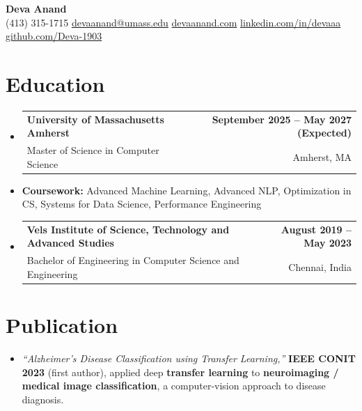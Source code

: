 \documentclass[letterpaper,10pt]{article}
\makeatletter
\newcommand{\resumeSubheading}[4]{
  \vspace{1pt}\item
    \begin{tabular*}{0.985\textwidth}[t]{l@{\extracolsep{\fill}}r}
      \textbf{#1} & \textbf{\small #2} \\
      {\small\color{ResumeSlate} #3} & {\small\color{ResumeSlate} #4} \\
    \end{tabular*}\vspace{-6pt}
}
\newcommand{\resumeSubItem}[1]{\item[]\small{#1\vspace{-1pt}}}
\newcommand{\resumeSubHeadingListStart}{\begin{itemize}[leftmargin=0.0in, label={}, itemsep=2pt, topsep=2pt]}
\newcommand{\resumeSubHeadingListEnd}{\end{itemize}}
\makeatother
\begin{document}
\begin{center}
    {\LARGE \bfseries \textcolor{ResumeNavy}{Deva Anand}} \\ \vspace{4pt}
    \small
    (413) 315-1715 \enspace\textbar\enspace
    \href{mailto:devaanand@umass.edu}{devaanand@umass.edu} \enspace\textbar\enspace
    \href{https://devaanand.com}{devaanand.com} \enspace\textbar\enspace
    \href{https://linkedin.com/in/devaaa/}{linkedin.com/in/devaaa} \enspace\textbar\enspace
    \href{https://github.com/Deva-1903}{github.com/Deva-1903}
    \vspace{-6pt}
\end{center}
\section{Education}
\resumeSubHeadingListStart
  \resumeSubheading
    {University of Massachusetts Amherst}{September 2025 -- May 2027 (Expected)}
    {Master of Science in Computer Science}{Amherst, MA}
  \resumeSubItem{\textbf{Coursework:} Advanced Machine Learning, Advanced NLP, Optimization in CS, Systems for Data Science, Performance Engineering}
  \resumeSubheading
    {Vels Institute of Science, Technology and Advanced Studies}{August 2019 -- May 2023}
    {Bachelor of Engineering in Computer Science and Engineering}{Chennai, India}
\resumeSubHeadingListEnd
\vspace{-4pt}
\section{Publication}
\begin{itemize}[leftmargin=0.18in, itemsep=0pt, topsep=1pt]
  \item\small \textit{``Alzheimer's Disease Classification using Transfer Learning,''} \textbf{IEEE CONIT 2023} (first author), applied deep \textbf{transfer learning} to \textbf{neuroimaging / medical image classification}, a computer-vision approach to disease diagnosis.
\end{itemize}
\vspace{-4pt}
\end{document}
